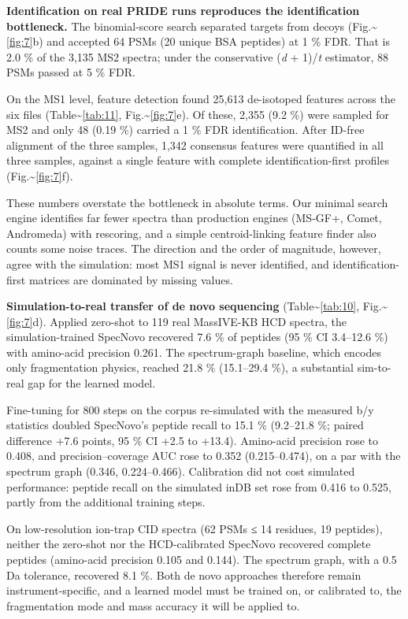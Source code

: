 \documentclass[pdflatex,sn-mathphys-num]{sn-jnl}
\begin{document}
\textbf{Identification on real PRIDE runs reproduces the identification bottleneck.} The binomial-score search separated targets from decoys (Fig.\textasciitilde{}\ref{fig:7}b) and accepted 64 PSMs (20 unique BSA peptides) at 1 \% FDR. That is 2.0 \% of the 3,135 MS2 spectra; under the conservative (\emph{d} + 1)/\emph{t} estimator, 88 PSMs passed at 5 \% FDR.

On the MS1 level, feature detection found 25,613 de-isotoped features across the six files (Table\textasciitilde{}\ref{tab:11}, Fig.\textasciitilde{}\ref{fig:7}e). Of these, 2,355 (9.2 \%) were sampled for MS2 and only 48 (0.19 \%) carried a 1 \% FDR identification. After ID-free alignment of the three samples, 1,342 consensus features were quantified in all three samples, against a single feature with complete identification-first profiles (Fig.\textasciitilde{}\ref{fig:7}f).

These numbers overstate the bottleneck in absolute terms. Our minimal search engine identifies far fewer spectra than production engines (MS-GF+, Comet, Andromeda) with rescoring, and a simple centroid-linking feature finder also counts some noise traces. The direction and the order of magnitude, however, agree with the simulation: most MS1 signal is never identified, and identification-first matrices are dominated by missing values.

\textbf{Simulation-to-real transfer of de novo sequencing} (Table\textasciitilde{}\ref{tab:10}, Fig.\textasciitilde{}\ref{fig:7}d). Applied zero-shot to 119 real MassIVE-KB HCD spectra, the simulation-trained SpecNovo recovered 7.6 \% of peptides (95 \% CI 3.4--12.6 \%) with amino-acid precision 0.261. The spectrum-graph baseline, which encodes only fragmentation physics, reached 21.8 \% (15.1--29.4 \%), a substantial sim-to-real gap for the learned model.

Fine-tuning for 800 steps on the corpus re-simulated with the measured b/y statistics doubled SpecNovo's peptide recall to 15.1 \% (9.2--21.8 \%; paired difference +7.6 points, 95 \% CI +2.5 to +13.4). Amino-acid precision rose to 0.408, and precision--coverage AUC rose to 0.352 (0.215--0.474), on a par with the spectrum graph (0.346, 0.224--0.466). Calibration did not cost simulated performance: peptide recall on the simulated inDB set rose from 0.416 to 0.525, partly from the additional training steps.

On low-resolution ion-trap CID spectra (62 PSMs ≤ 14 residues, 19 peptides), neither the zero-shot nor the HCD-calibrated SpecNovo recovered complete peptides (amino-acid precision 0.105 and 0.144). The spectrum graph, with a 0.5 Da tolerance, recovered 8.1 \%. Both de novo approaches therefore remain instrument-specific, and a learned model must be trained on, or calibrated to, the fragmentation mode and mass accuracy it will be applied to.
\end{document}
